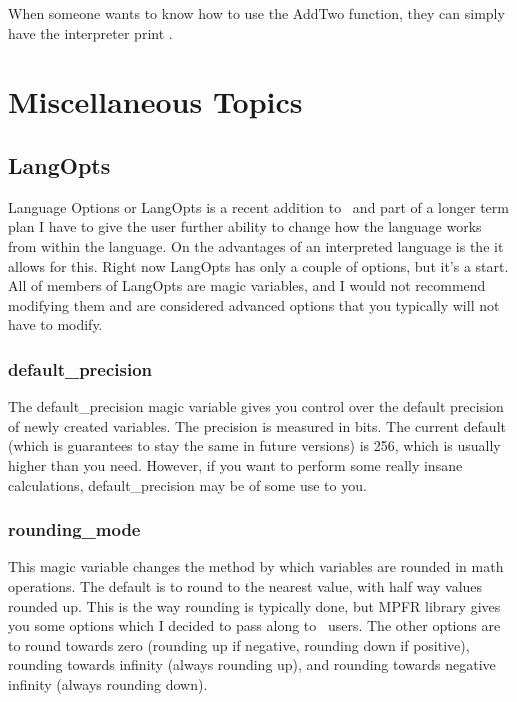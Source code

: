 When someone wants to know how to use the AddTwo function, they can simply have the interpreter print .




%
%
\chapter{Miscellaneous Topics}

\section{LangOpts}

Language Options or LangOpts is a recent addition to \SSquared\ and part of a longer term plan I have to give the user further ability to change how the language works from within the language.  On the advantages of an interpreted language is the it allows for this.  Right now LangOpts has only a couple of options, but it's a start.  All of members of LangOpts are magic variables, and I would not recommend modifying them and are considered advanced options that you typically will not have to modify.

\subsection{default\_precision}

The default\_precision magic variable gives you control over the default precision of newly created variables.  The precision is measured in bits.  The current default (which is guarantees to stay the same in future versions) is 256, which is usually higher than you need.  However, if you want to perform some really insane calculations, default\_precision may be of some use to you.

\subsection{rounding\_mode}

This magic variable changes the method by which variables are rounded in math operations.  The default is to round to the nearest value, with half way values rounded up.  This is the way rounding is typically done, but MPFR library gives you some options which I decided to pass along to \SSquared\ users.  The other options are to round towards zero (rounding up if negative, rounding down if positive), rounding towards infinity (always rounding up), and rounding towards negative infinity (always rounding down).

